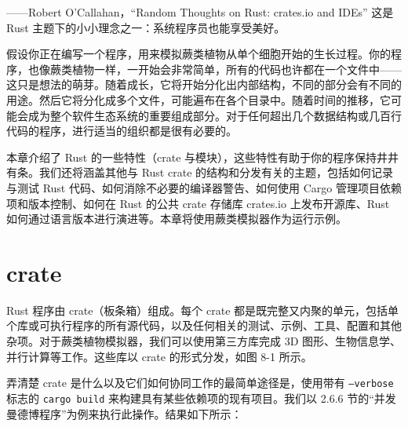 
\begin{myEpigraph}{——Robert O'Callahan，“Random Thoughts on Rust: crates.io and IDEs”}
这是 Rust 主题下的小小理念之一：系统程序员也能享受美好。
\end{myEpigraph}

假设你正在编写一个程序，用来模拟蕨类植物从单个细胞开始的生长过程。你的程序，也像蕨类植物一样，一开始会非常简单，所有的代码也许都在一个文件中——这只是想法的萌芽。随着成长，它将开始分化出内部结构，不同的部分会有不同的用途。然后它将分化成多个文件，可能遍布在各个目录中。随着时间的推移，它可能会成为整个软件生态系统的重要组成部分。对于任何超出几个数据结构或几百行代码的程序，进行适当的组织都是很有必要的。

本章介绍了 Rust 的一些特性（crate 与模块），这些特性有助于你的程序保持井井有条。我们还将涵盖其他与 Rust crate 的结构和分发有关的主题，包括如何记录与测试 Rust 代码、如何消除不必要的编译器警告、如何使用 Cargo 管理项目依赖项和版本控制、如何在 Rust 的公共 crate 存储库 crates.io 上发布开源库、Rust 如何通过语言版本进行演进等。本章将使用蕨类模拟器作为运行示例。

\section{crate}

Rust 程序由 crate（板条箱）组成。每个 crate 都是既完整又内聚的单元，包括单个库或可执行程序的所有源代码，以及任何相关的测试、示例、工具、配置和其他杂项。对于蕨类植物模拟器，我们可以使用第三方库完成 3D 图形、生物信息学、并行计算等工作。这些库以 crate 的形式分发，如图 8-1 所示。


弄清楚 crate 是什么以及它们如何协同工作的最简单途径是，使用带有 \texttt{--verbose} 标志的 \texttt{cargo build} 来构建具有某些依赖项的现有项目。我们以 2.6.6 节的“并发曼德博程序”为例来执行此操作。结果如下所示：

